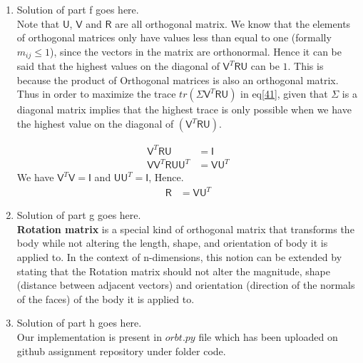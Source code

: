 \documentclass[a4paper, 11pt]{article}
\newcommand{\mat}[1]{\boldsymbol { \mathsf{#1}} }
\begin{document}
\begin{enumerate}[label=\alph*.]
    \item
    Solution of part f goes here.\\
    Note that $\mat U$, $\mat V$ and $\mat R$ are all orthogonal matrix. We know that the elements of orthogonal matrices only have values less than equal to one (formally $m_{ij} \leq 1$), since the vectors in the matrix are orthonormal. Hence it can be said that the highest values on the diagonal of $\mat V^T \mat R \mat U$ can be $1$. This is because the product of Orthogonal matrices is also an orthogonal matrix. Thus in order to maximize the trace $tr(\mat \Sigma \mat V^T \mat R \mat U)$ in eq\eqref{41}, given that $\mat \Sigma$ is a diagonal matrix implies that the highest trace is only possible when we have the highest value on the diagonal of $(\mat V^T \mat R \mat U)$.
    
    \begin{align}
        \mat V^T \mat R \mat U & = \mat I\\
        \mat V \mat V^T \mat R \mat U \mat U^T &= \mat V \mat U^T
    \end{align}
    We have $\mat V^T \mat V = \mat I$ and $\mat U \mat U^T = \mat I$, Hence.
    \begin{align}
        \mat R &= \mat V \mat U^T
    \end{align}
    
    
    
    \item
    Solution of part g goes here.\\
    \textbf{Rotation matrix} is a special kind of orthogonal matrix that transforms the body while not altering the length, shape, and orientation of body it is applied to. In the context of n-dimensions, this notion can be extended by stating that the Rotation matrix should not alter the magnitude, shape (distance between adjacent vectors) and orientation (direction of the normals of the faces) of the body it is applied to.
    
    \item
    Solution of part h goes here.\\
    Our implementation is present in $orbt.py$ file which has been uploaded on github assignment repository under folder code.
    

\end{enumerate}
\end{document}
